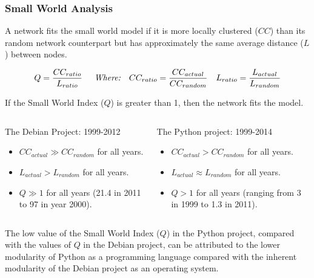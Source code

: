 \documentclass[ignorenonframetext,red,8pt,notes=hide]{beamer}
\begin{document}
\begin{frame}
\frametitle{Small World Analysis}

A network fits the small world model if it is more locally clustered ($CC$) than its random network counterpart but has approximately the same average distance ($L$) between nodes. 

\begin{align}
Q = \frac{CC_{ratio}}{L_{ratio}} \nonumber & \hspace{0.5cm} \textit{Where:} & 
CC_{ratio}& = \frac{CC_{actual}}{CC_{random}} \nonumber &
L_{ratio}& = \frac{L_{actual}}{L_{random}} \nonumber \\
\end{align}

If the Small World Index ($Q$) is greater than 1, then the network fits the model. 

\pause

\begin{columns}[c]
\begin{column}{0.5\textwidth}
\begin{block}{The Debian Project: 1999-2012}
\begin{itemize}
\item $CC_{actual} \gg CC_{random}$ for all years.
\item $L_{actual} > L_{random}$ for all years.
\item $Q \gg 1$ for all years (21.4 in 2011 to 97 in year 2000).
\end{itemize}
\end{block}
\end{column}

\begin{column}{0.5\textwidth}
\begin{block}{The Python project: 1999-2014}
\begin{itemize}
\item $CC_{actual} > CC_{random}$ for all years.
\item $L_{actual} \approx L_{random}$ for all years.
\item $Q > 1$ for all years (ranging from 3 in 1999 to 1.3 in 2011).
\end{itemize}
\end{block}
\end{column}
\end{columns}

\vspace{0.3cm}

The low value of the Small World Index ($Q$) in the Python project, compared with the values of $Q$ in the Debian project, can be attributed to the lower modularity of Python as a programming language compared with the inherent modularity of the Debian project as an operating system.

\end{frame}
\end{document}
